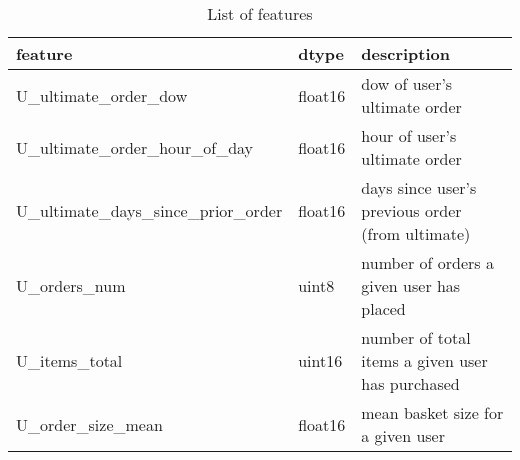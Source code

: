 \documentclass[11pt]{article}
\theoremstyle{definition}
\numberwithin{equation}{section}
\begin{document}
\tabulinesep=2pt
\begin{longtabu} to
  \caption[]{List of features}\label{tbl:features} \\
  \hline
  \textrm{feature}                                  & \textrm{dtype}                                     & description  \\
  \toprule \hline
  U\_ultimate\_order\_dow                &                 float16                 & dow of user's ultimate order                                                                                                                                                                                                                      \\ \hline
  U\_ultimate\_order\_hour\_of\_day      &         float16                         & hour of user's ultimate order                                                                                                                                                                                                                     \\ \hline
  U\_ultimate\_days\_since\_prior\_order &    float16                              & days since user's previous order (from ultimate)                                                                                                                                                                                                  \\ \hline
  U\_orders\_num                         &                         uint8           & number of orders a given user has placed                                                                                                                                                                                                          \\ \hline
  U\_items\_total                        &                        uint16           & number of total items a given user has purchased                                                                                                                                                                                                  \\ \hline
  U\_order\_size\_mean                   &                    float16              & mean basket size for a given user                                                                                                                                                                                                                 \\ \hline

\end{longtabu}
\end{document}
